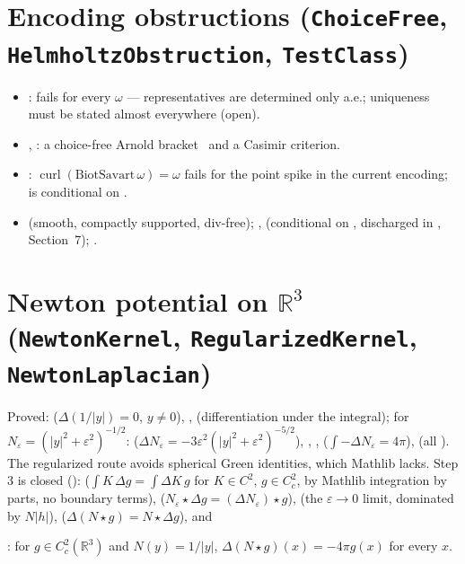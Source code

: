 \documentclass[11pt]{article}
\begin{document}
\section{Encoding obstructions (\texttt{ChoiceFree}, \texttt{HelmholtzObstruction}, \texttt{TestClass})}\label{sec:enc}
\begin{itemize}
\item {}\coined:  fails for every $\omega$ --- representatives are determined only a.e.; uniqueness must be stated almost everywhere (open).
\item {}, \coined: a choice-free Arnold bracket~\cite{Arnold1966} and a Casimir criterion.
\item {}\coined: $\operatorname{curl}(\mathrm{BiotSavart}\,\omega)=\omega$ fails for the point spike in the current encoding; \coined{} is conditional on .
\item {}\coined{} (smooth, compactly supported, div-free); , \coined{} (conditional on , discharged in , Section~7); \coined.
\end{itemize}
\section{Newton potential on $\mathbb{R}^3$ (\texttt{NewtonKernel}, \texttt{RegularizedKernel}, \texttt{NewtonLaplacian})}
Proved:  ($\Delta(1/|y|)=0$, $y\ne0$), ,  (differentiation under the integral); for $N_\varepsilon=(|y|^2+\varepsilon^2)^{-1/2}$:  ($\Delta N_\varepsilon=-3\varepsilon^2(|y|^2+\varepsilon^2)^{-5/2}$), , ,  ($\int-\Delta N_\varepsilon=4\pi$),  (all \coined). The regularized route avoids spherical Green identities, which Mathlib lacks.
Step 3 is closed ():  ($\int K\,\Delta g=\int \Delta K\,g$ for $K\in C^2$, $g\in C^2_c$, by Mathlib integration by parts, no boundary terms),  ($N_\varepsilon\star\Delta g=(\Delta N_\varepsilon)\star g$),  (the $\varepsilon\to0$ limit, dominated by $N|h|$),  ($\Delta(N\star g)=N\star\Delta g$), and
\begin{theorem}\coined: for $g\in C^2_c(\mathbb{R}^3)$ and $N(y)=1/|y|$, $\Delta(N\star g)(x)=-4\pi g(x)$ for every $x$.\end{theorem}
\end{document}
